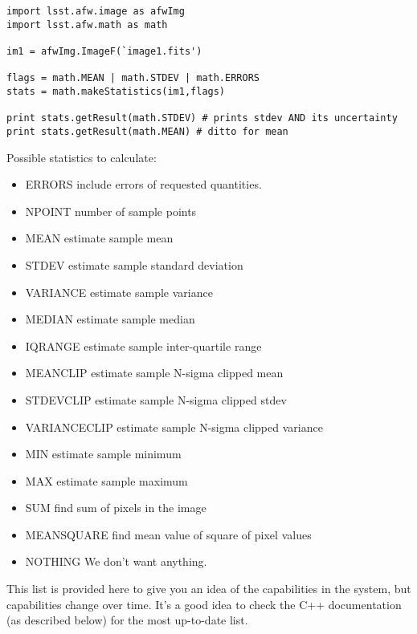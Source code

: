 \begin{verbatim}
import lsst.afw.image as afwImg
import lsst.afw.math as math

im1 = afwImg.ImageF(`image1.fits')

flags = math.MEAN | math.STDEV | math.ERRORS
stats = math.makeStatistics(im1,flags)

print stats.getResult(math.STDEV) # prints stdev AND its uncertainty
print stats.getResult(math.MEAN) # ditto for mean

\end{verbatim}

Possible statistics to calculate:
\begin{itemize}
\item ERRORS     include errors of requested quantities.
\item NPOINT     number of sample points
\item MEAN     estimate sample mean
\item STDEV     estimate sample standard deviation
\item VARIANCE     estimate sample variance
\item MEDIAN     estimate sample median
\item IQRANGE     estimate sample inter-quartile range
\item MEANCLIP     estimate sample N-sigma clipped mean
\item STDEVCLIP     estimate sample N-sigma clipped stdev
\item VARIANCECLIP     estimate sample N-sigma clipped variance
\item MIN     estimate sample minimum
\item MAX     estimate sample maximum
\item SUM     find sum of pixels in the image
\item MEANSQUARE     find mean value of square of pixel values
\item NOTHING     We don't want anything.
\end{itemize}

This list is provided here to give you an idea of the capabilities in
the system, but capabilities change over time.  It's a good idea to
check the C++ documentation (as described below) for the most
up-to-date list.


